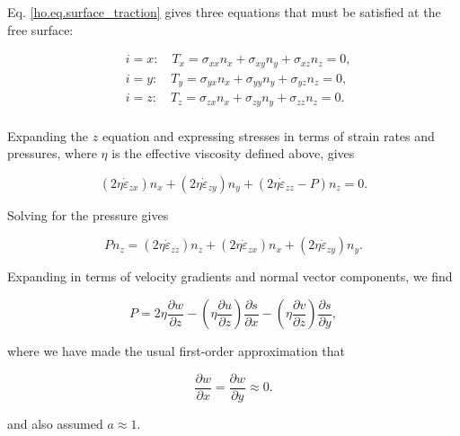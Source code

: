 \noindent
Eq. \eqref{ho.eq.surface_traction} gives three equations that must be satisfied at the free surface:

\begin{equation}
  \begin{split}
    & i=x: \quad T_{x} = \sigma _{xx}n_{x} + \sigma _{xy}n_{y} + \sigma _{xz}n_{z}=0, \\ 
    & i=y: \quad T_{y} = \sigma _{yx}n_{x} + \sigma _{yy}n_{y} + \sigma _{yz}n_{z}=0, \\ 
    & i=z: \quad T_{z} = \sigma _{zx}n_{x} + \sigma _{zy}n_{y} + \sigma _{zz}n_{z}=0. \\ 
  \end{split}
\end{equation}

\noindent
Expanding the $z$ equation and expressing stresses in terms of strain rates and pressures, where $\eta$ is the effective viscosity defined above, gives

\begin{equation}
  \left( 2\eta \dot{\varepsilon }_{zx} \right)n_{x}+\left( 2\eta \dot{\varepsilon }_{zy} \right)n_{y}+\left( 2\eta \dot{\varepsilon }_{zz}-P \right)n_{z}=0.
\end{equation}

\noindent
Solving for the pressure gives

\begin{equation}
  Pn_{z} = \left( 2\eta \dot{\varepsilon }_{zz} \right)n_{z}+\left( 2\eta \dot{\varepsilon }_{zx} \right)n_{x}+\left( 2\eta \dot{\varepsilon }_{zy} \right)n_{y}.
\end{equation}

\noindent
Expanding in terms of velocity gradients and normal vector components, we find

\begin{equation}
  P = 2\eta \frac{\partial w}{\partial z}-\left( \eta \frac{\partial u}{\partial z} \right)\frac{\partial s}{\partial x}-\left( \eta \frac{\partial v}{\partial z} \right)\frac{\partial s}{\partial y},
\end{equation}

\noindent
where we have made the usual first-order approximation that 

\begin{equation}
  \frac{\partial w}{\partial x}=\frac{\partial w}{\partial y}\approx 0.
\end{equation}

\noindent
and also assumed $a \approx 1$.

